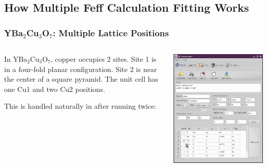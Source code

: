 \documentclass[10pt, xcolor=x11names, compress]{beamer}
\newcommand{\ybco}{YBa$_2$Cu$_3$O$_7$}
\begin{document}
\subsection[Explain]{How Multiple Feff Calculation Fitting Works}
\begin{frame}[fragile]
  \frametitle{\ybco: Multiple Lattice Positions}

  \begin{columns}
    \begin{column}{0.55\linewidth}
      In {\ybco}, copper occupies 2 sites.  Site 1 is in a
      {\color{Blue3}four-fold planar} configuration.  Site 2 is near
      the center of a {\color{Blue3}square pyramid}.  The unit cell
      has \alert{one} Cu1 and \alert{two} Cu2 positions.

      \bigskip
      
      This is handled naturally in {\artemis} after running {\feff}
      twice:
    \end{column}
    \begin{column}{0.45\linewidth}
      \includegraphics[width=0.8\linewidth]{images/atoms_ybco.png}
    \end{column}
  \end{columns}
  



\end{frame}
\end{document}
